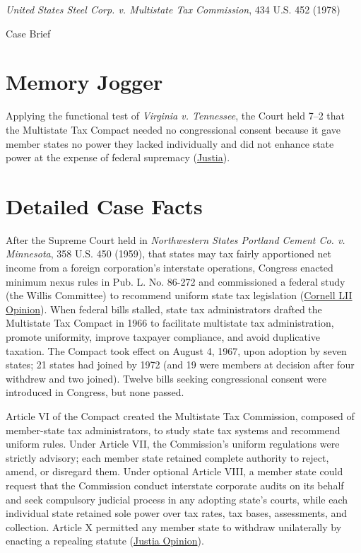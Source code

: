 \documentclass[12pt]{article}
\begin{document}
\begin{center}
{\LARGE \textit{United States Steel Corp. v. Multistate Tax Commission}, 434 U.S. 452 (1978)\par}
\vspace{0.8em}
{\large Case Brief\par}
\end{center}
\vspace{1em}

\section{Memory Jogger}
Applying the functional test of \textit{Virginia v. Tennessee}, the Court held 7--2 that the Multistate Tax Compact needed no congressional consent because it gave member states no power they lacked individually and did not enhance state power at the expense of federal supremacy (\href{https://supreme.justia.com/cases/federal/us/434/452/}{Justia}).

\section{Detailed Case Facts}
After the Supreme Court held in \textit{Northwestern States Portland Cement Co. v. Minnesota}, 358 U.S. 450 (1959), that states may tax fairly apportioned net income from a foreign corporation's interstate operations, Congress enacted minimum nexus rules in Pub. L. No. 86-272 and commissioned a federal study (the Willis Committee) to recommend uniform state tax legislation (\href{https://www.law.cornell.edu/supremecourt/text/434/452}{Cornell LII Opinion}). When federal bills stalled, state tax administrators drafted the Multistate Tax Compact in 1966 to facilitate multistate tax administration, promote uniformity, improve taxpayer compliance, and avoid duplicative taxation. The Compact took effect on August 4, 1967, upon adoption by seven states; 21 states had joined by 1972 (and 19 were members at decision after four withdrew and two joined). Twelve bills seeking congressional consent were introduced in Congress, but none passed.

Article VI of the Compact created the Multistate Tax Commission, composed of member-state tax administrators, to study state tax systems and recommend uniform rules. Under Article VII, the Commission's uniform regulations were strictly advisory; each member state retained complete authority to reject, amend, or disregard them. Under optional Article VIII, a member state could request that the Commission conduct interstate corporate audits on its behalf and seek compulsory judicial process in any adopting state's courts, while each individual state retained sole power over tax rates, tax bases, assessments, and collection. Article X permitted any member state to withdraw unilaterally by enacting a repealing statute (\href{https://supreme.justia.com/cases/federal/us/434/452/}{Justia Opinion}).
\end{document}
